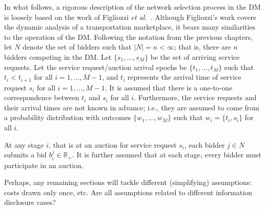 In what follows, a rigorous description of the network selection process in the DM is loosely based on the work of Figliozzi \emph{et al.}~\cite{FigliozziJaillet2008}. Although Figliozzi's work covers the dynamic analysis of a transportation marketplace, it bears many similarities to the operation of the DM. Following the notation from the previous chapters, let $N$ denote the set of bidders such that $|N| = n < \infty$; that is, there are $n$ bidders competing in the DM. Let $\{s_1,\ldots,s_M\}$ be the set of arriving service requests. Let the service request/auction arrival epochs be $\{t_1,\ldots,t_M\}$ such that $t_i < t_{i+1}$ for all $i=1,\ldots,M-1$, and $t_i$ represents the arrival time of service request $s_i$ for all $i=1,\ldots,M-1$. It is assumed that there is a one-to-one correspondence between $t_i$ and $s_i$ for all $i$. Furthermore, the service requests and their arrival times are not known in advance; i.e., they are assumed to come from a probability distribution with outcomes $\{w_1,\ldots,w_M\}$ such that $w_i = \{t_i, s_i\}$ for all $i$.

At any stage $i$, that is at an auction for service request $s_i$, each bidder $j\in N$ submits a bid $b^j_i\in\mathbb{R}_+$. It is further assumed that at each stage, every bidder must participate in an auction.

Perhaps, any remaining sections will tackle different (simplifying) assumptions: costs drawn only once, etc. Are all assumptions related to different information disclosure cases?

